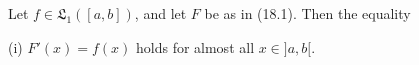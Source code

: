 Let $f \in \mathfrak{L}_1([a, b])$, and let $F$ be as in (18.1). Then the equality

(i) $F'(x) = f(x)$ holds for almost all $x \in ]a, b[$.